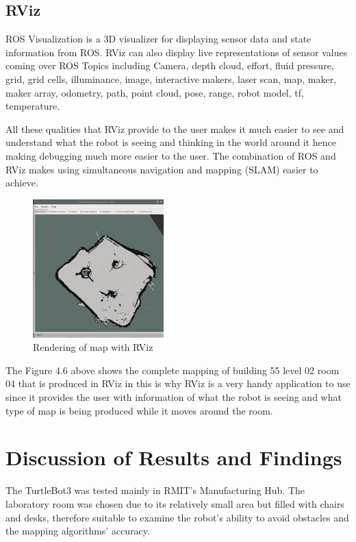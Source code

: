 \documentclass[12pt]{report}
\begin{document}
\section{RViz}
ROS Visualization is a 3D visualizer for displaying sensor data and state information from ROS.
RViz can also display live representations of sensor values coming over ROS Topics including Camera, depth cloud, effort, fluid pressure, grid, grid cells, illuminance, image, interactive makers, laser scan, map, maker, maker array, odometry, path, point cloud, pose, range, robot model, tf, temperature.\par
\vspace{1em}
All these qualities that RViz provide to the user makes it much easier to see and understand what the robot is seeing and thinking in the world around it hence making debugging much more easier to the user. The combination of ROS and RViz makes using simultaneous navigation and mapping (SLAM) easier to achieve.\par
\begin{figure}[H]
        \centering
        \includegraphics[width=0.45\textwidth]{Fig8.png}
        \caption{Rendering of map with RViz}
        \label{fig:8}
    \end{figure}
\vspace{1em}
The Figure 4.6 above shows the complete mapping of building 55 level 02 room 04 that is produced in RViz in this is why RViz is a very handy application to use since it provides the user with information of what the robot is seeing and what type of map is being produced while it moves around the room.\par
\vspace{1em}
\chapter{Discussion of Results and Findings}
The TurtleBot3 was tested mainly in RMIT’s Manufacturing Hub. The laboratory room was chosen due to its relatively small area but filled with chairs and desks, therefore suitable to examine the robot’s ability to avoid obstacles and the mapping algorithms’ accuracy.\par
\vspace{1em}
\end{document}

